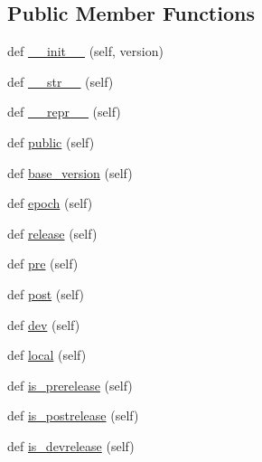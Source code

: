 \subsection*{Public Member Functions}
\begin{DoxyCompactItemize}
\item 
def \hyperlink{classsetuptools_1_1__vendor_1_1packaging_1_1version_1_1LegacyVersion_aa498bd8f6232be5f275db7847a871788}{\+\_\+\+\_\+init\+\_\+\+\_\+} (self, version)
\item 
def \hyperlink{classsetuptools_1_1__vendor_1_1packaging_1_1version_1_1LegacyVersion_a2d5d1dba9fe4763402aaf7bee0f5b950}{\+\_\+\+\_\+str\+\_\+\+\_\+} (self)
\item 
def \hyperlink{classsetuptools_1_1__vendor_1_1packaging_1_1version_1_1LegacyVersion_ae6ec300c777a71e70dd6bbde4d9d0abe}{\+\_\+\+\_\+repr\+\_\+\+\_\+} (self)
\item 
def \hyperlink{classsetuptools_1_1__vendor_1_1packaging_1_1version_1_1LegacyVersion_ae88e56fe4dc2f7c4a1604e247891323d}{public} (self)
\item 
def \hyperlink{classsetuptools_1_1__vendor_1_1packaging_1_1version_1_1LegacyVersion_ac993b34559a96834c19c38a6ce8f8066}{base\+\_\+version} (self)
\item 
def \hyperlink{classsetuptools_1_1__vendor_1_1packaging_1_1version_1_1LegacyVersion_a825e2844873ae7f946a9b8a472903cbe}{epoch} (self)
\item 
def \hyperlink{classsetuptools_1_1__vendor_1_1packaging_1_1version_1_1LegacyVersion_ae37c57797d1c0b14fa8b35a2203dad94}{release} (self)
\item 
def \hyperlink{classsetuptools_1_1__vendor_1_1packaging_1_1version_1_1LegacyVersion_a759003b6560e21c71dc9f52ffffbeb94}{pre} (self)
\item 
def \hyperlink{classsetuptools_1_1__vendor_1_1packaging_1_1version_1_1LegacyVersion_a7a24b0aecc364f4b0d3fa41cd81e147d}{post} (self)
\item 
def \hyperlink{classsetuptools_1_1__vendor_1_1packaging_1_1version_1_1LegacyVersion_a9492b8c9824d63a5e95985444ebc6de8}{dev} (self)
\item 
def \hyperlink{classsetuptools_1_1__vendor_1_1packaging_1_1version_1_1LegacyVersion_a58852ae192cdead9bd5210febc0993f8}{local} (self)
\item 
def \hyperlink{classsetuptools_1_1__vendor_1_1packaging_1_1version_1_1LegacyVersion_ac9a68dca4cbd62604e30bc45aff7a972}{is\+\_\+prerelease} (self)
\item 
def \hyperlink{classsetuptools_1_1__vendor_1_1packaging_1_1version_1_1LegacyVersion_a7f770c4581549d9e3471ad2f6ec6c53c}{is\+\_\+postrelease} (self)
\item 
def \hyperlink{classsetuptools_1_1__vendor_1_1packaging_1_1version_1_1LegacyVersion_a8fb0f8ed4cf2adf8a694e736922ba7e0}{is\+\_\+devrelease} (self)
\end{DoxyCompactItemize}


